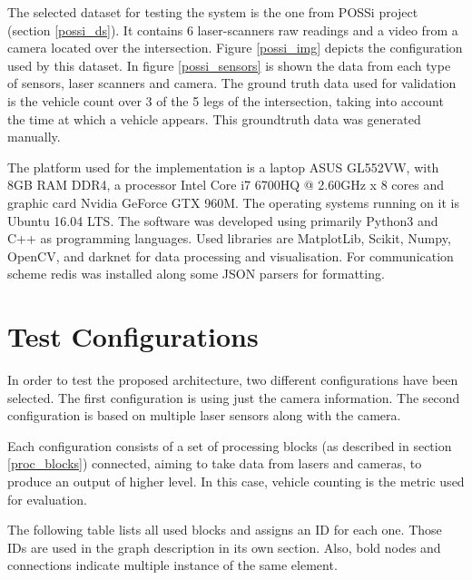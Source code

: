 The selected dataset for testing the system is the one from POSSi project (section \ref{possi_ds}). It contains 6 laser-scanners raw readings and a video from a camera located over the intersection. Figure \ref{possi_img} depicts the configuration used by this dataset. In figure \ref{possi_sensors} is shown the data from each type of sensors, laser scanners and camera. The ground truth data used for validation is the vehicle count over 3 of the 5 legs of the intersection, taking into account the time at which a vehicle appears. This groundtruth data was generated manually.

 

The platform used for the implementation is a laptop ASUS GL552VW, with 8GB RAM DDR4, a processor Intel Core i7 6700HQ @ 2.60GHz x 8 cores and graphic card Nvidia GeForce GTX 960M. The operating systems running on it is Ubuntu 16.04 LTS. The software was developed using primarily Python3 and C++ as programming languages. Used libraries are MatplotLib, Scikit, Numpy, OpenCV, and darknet for data processing and visualisation. For communication scheme redis was installed along some JSON parsers for formatting.

\section{Test Configurations}
In order to test the proposed architecture, two different configurations have been selected. The first configuration is using just the camera information. The second configuration is based on multiple laser sensors along with the camera.

Each configuration consists of a set of processing blocks (as described in section \ref{proc_blocks}) connected, aiming to take data from  lasers and cameras, to produce an output of higher level. In this case, vehicle counting is the metric used for evaluation.

The following table lists all used blocks and assigns an ID for each one. Those IDs are used in the graph description in its own section. Also, bold nodes and connections indicate multiple instance of the same element.

